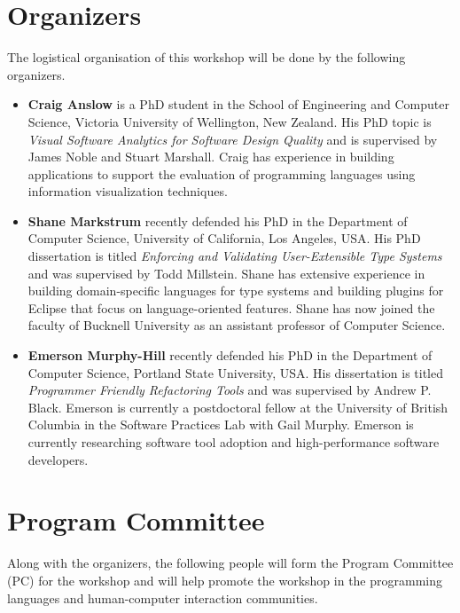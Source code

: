 \documentclass[9pt]{sigplanconf}
\begin{document}
\section{Organizers}

The logistical organisation of this workshop will be done by the following organizers.

\begin{itemize}
\item \textbf{Craig Anslow} is a PhD student in the School of
  Engineering and Computer Science, Victoria University of Wellington,
  New Zealand. His PhD topic is \emph{Visual Software Analytics for
    Software Design Quality} and is supervised by James Noble and
  Stuart Marshall. Craig has experience in building applications to
  support the evaluation of programming languages using information
  visualization techniques.

\item \textbf{Shane Markstrum} recently defended his PhD in the
  Department of Computer Science, University of California, Los
  Angeles, USA. His PhD dissertation is titled \emph{Enforcing and
    Validating User-Extensible Type Systems} and was supervised by
  Todd Millstein. Shane has extensive experience in building
  domain-specific languages for type systems and building plugins for
  Eclipse that focus on language-oriented features. Shane has now
  joined the faculty of Bucknell University as an assistant professor
  of Computer Science.

\item \textbf{Emerson Murphy-Hill} recently defended his PhD in the
  Department of Computer Science, Portland State University, USA. His
  dissertation is titled \emph{Programmer Friendly Refactoring Tools}
  and was supervised by Andrew P. Black. Emerson is currently a
  postdoctoral fellow at the University of British Columbia in the
  Software Practices Lab with Gail Murphy.  Emerson is currently
  researching software tool adoption and high-performance software
  developers.
\end{itemize}

\section{Program Committee}

Along with the organizers, the following people will form the Program
Committee (PC) for the workshop and will help promote the workshop in
the programming languages and human-computer interaction communities.
\end{document}
